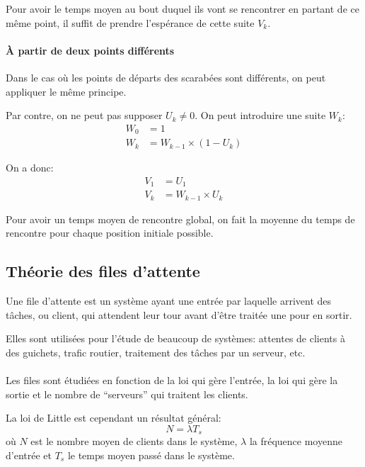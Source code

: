       Pour avoir le temps moyen au bout duquel ils vont se rencontrer en
      partant de ce même point, il suffit de prendre l'espérance de cette suite
      $V_k$. %

    \paragraph{À partir de deux points différents}
      Dans le cas où les points de départs des scarabées sont différents, on peut
      appliquer le même principe.

      Par contre, on ne peut pas supposer $U_k \neq 0$.
      On peut introduire une suite $W_k$:
      \begin{align*}
        W_0 &= 1 \\
        W_k &= W_{k-1} \times (1 - U_k)
      \end{align*}

      On a donc:
      \begin{align*}
        V_1  &= U_1 \\
        V_k &= W_{k-1} \times U_k
      \end{align*}

      Pour avoir un temps moyen de rencontre global, on fait la moyenne du temps
      de rencontre pour chaque position initiale possible. %

\subsection{Théorie des files d'attente}
  Une file d'attente est un système ayant une entrée par laquelle arrivent des
  tâches, ou client, qui attendent leur tour avant d'être traitée une pour en
  sortir.

  Elles sont utilisées pour l'étude de beaucoup de systèmes: attentes de
  clients à des guichets, trafic routier, traitement des tâches par un
  serveur, etc.

  \paragraph{}
  Les files sont étudiées en fonction de la loi qui gère l'entrée, la loi qui
  gère la sortie et le nombre de ``serveurs'' qui traitent les clients.

  La loi de Little est cependant un résultat général:
    \[N = \lambda T_s\]
  où $N$ est le nombre moyen de clients dans le système, $\lambda$ la fréquence
  moyenne d'entrée et $T_s$ le temps moyen passé dans le système.

